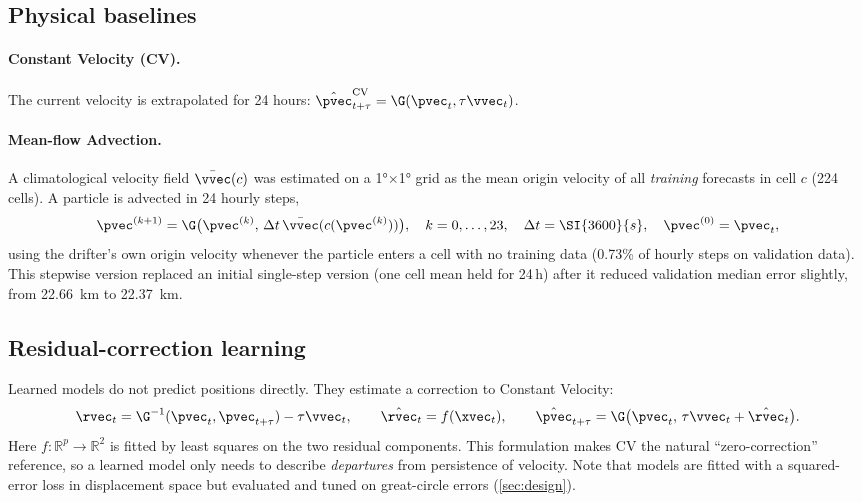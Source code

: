 \subsection{Physical baselines}
\paragraph{Constant Velocity (CV).} The current velocity is extrapolated for 24 hours: $\hat\pvec^{\mathrm{CV}}_{t+\tau}=\G(\pvec_t,\tau\vvec_t)$.

\paragraph{Mean-flow Advection.} A climatological velocity field $\bar\vvec(c)$ was estimated on a \ang{1}$\times$\ang{1} grid as the mean origin velocity of all \emph{training} forecasts in cell $c$ (224 cells). A particle is advected in 24 hourly steps,
\begin{equation}
\pvec^{(k+1)}=\G\big(\pvec^{(k)},\,\Delta t\,\bar\vvec(c(\pvec^{(k)}))\big),\quad k=0,\dots,23,\quad \Delta t=\SI{3600}{s},\quad \pvec^{(0)}=\pvec_t,
\end{equation}
using the drifter's own origin velocity whenever the particle enters a cell with no training data (0.73\% of hourly steps on validation data). This stepwise version replaced an initial single-step version (one cell mean held for 24\,h) after it reduced validation median error slightly, from \SI{22.66}{km} to \SI{22.37}{km}.

\subsection{Residual-correction learning}
Learned models do not predict positions directly. They estimate a correction to Constant Velocity:
\begin{equation}\label{eq:residual}
\rvec_t=\G^{-1}(\pvec_t,\pvec_{t+\tau})-\tau\vvec_t,\qquad
\hat\rvec_t=f(\xvec_t),\qquad
\hat\pvec_{t+\tau}=\G\big(\pvec_t,\,\tau\vvec_t+\hat\rvec_t\big).
\end{equation}
Here $f:\mathbb{R}^p\to\mathbb{R}^2$ is fitted by least squares on the two residual components. This formulation makes CV the natural ``zero-correction'' reference, so a learned model only needs to describe \emph{departures} from persistence of velocity. Note that models are fitted with a squared-error loss in displacement space but evaluated and tuned on great-circle errors (\cref{sec:design}).

